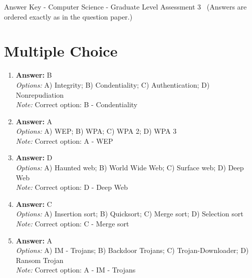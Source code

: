 \documentclass[12pt]{article}
\begin{document}
\begin{center}
Answer Key - Computer Science - Graduate Level Assessment 3 \
\small (Answers are ordered exactly as in the question paper.)
\end{center}

\section*{Multiple Choice}
\begin{enumerate}[label=\arabic*.]
\item \textbf{Answer:} B
\\ \textit{Options:} A) Integrity; B) Condentiality; C) Authentication; D) Nonrepudiation
\\ \textit{Note:} Correct option: B - Condentiality
\item \textbf{Answer:} A
\\ \textit{Options:} A) WEP; B) WPA; C) WPA 2; D) WPA 3
\\ \textit{Note:} Correct option: A - WEP
\item \textbf{Answer:} D
\\ \textit{Options:} A) Haunted web; B) World Wide Web; C) Surface web; D) Deep Web
\\ \textit{Note:} Correct option: D - Deep Web
\item \textbf{Answer:} C
\\ \textit{Options:} A) Insertion sort; B) Quicksort; C) Merge sort; D) Selection sort
\\ \textit{Note:} Correct option: C - Merge sort
\item \textbf{Answer:} A
\\ \textit{Options:} A) IM - Trojans; B) Backdoor Trojans; C) Trojan-Downloader; D) Ransom Trojan
\\ \textit{Note:} Correct option: A - IM - Trojans
\end{enumerate}
\end{document}
